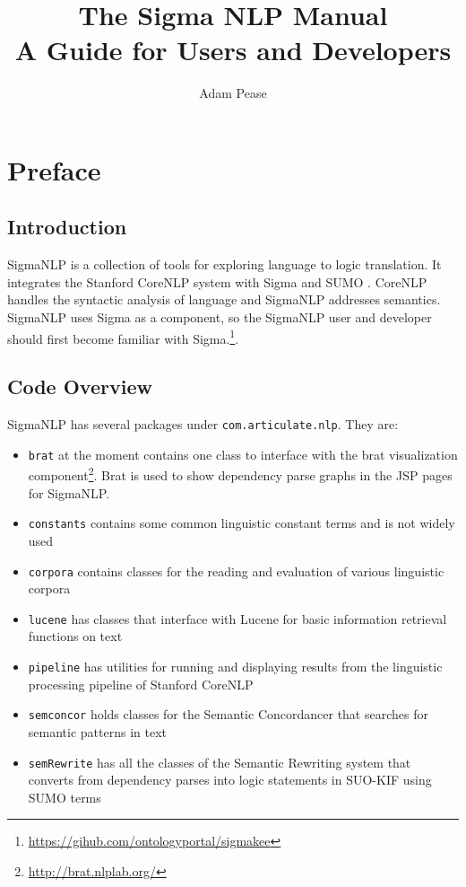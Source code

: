 \documentclass{book}
\begin{document}
\title{The Sigma NLP Manual \\ A Guide for Users and Developers}
\author{Adam Pease}

\maketitle
\date

\nomtcrule
\dominitoc[n]
\setcounter{secnumdepth}{1}
\setcounter{tocdepth}{1}
\tableofcontents
\listoffigures

\chapter{Preface}

\section{Introduction}

SigmaNLP is a collection of tools for exploring language to logic translation.  It
integrates the Stanford CoreNLP system with Sigma \citep{ac13} and SUMO \citep{np01,p11}.  CoreNLP handles the 
syntactic analysis of language and SigmaNLP addresses semantics.  SigmaNLP uses
Sigma as a component, so the SigmaNLP user and developer should first become
familiar with Sigma.\footnote{\url{https://gihub.com/ontologyportal/sigmakee}}.

\section{Code Overview}

SigmaNLP has several packages under \texttt{com.articulate.nlp}.  They are:

\begin{itemize}
\item \texttt{brat} at the moment contains one class to interface with the
brat visualization component\footnote{\url{http://brat.nlplab.org/}}\citep{Stenetorp:2012:BWT:2380921.2380942}.  
Brat is used to show dependency parse
graphs in the JSP pages for SigmaNLP.
\item \texttt{constants} contains some common linguistic constant terms and is
not widely used
\item \texttt{corpora} contains classes for the reading and evaluation of various
linguistic corpora
\item \texttt{lucene} has classes that interface with Lucene for basic information
retrieval functions on text
\item \texttt{pipeline} has utilities for running and displaying results from
the linguistic processing pipeline of Stanford CoreNLP
\item \texttt{semconcor} holds classes for the Semantic Concordancer \citep{pease2018}
that searches for semantic patterns in text
\item \texttt{semRewrite} has all the classes of the Semantic Rewriting system
that converts from dependency parses into logic statements in SUO-KIF using
SUMO terms
\end{itemize}
\end{document}
